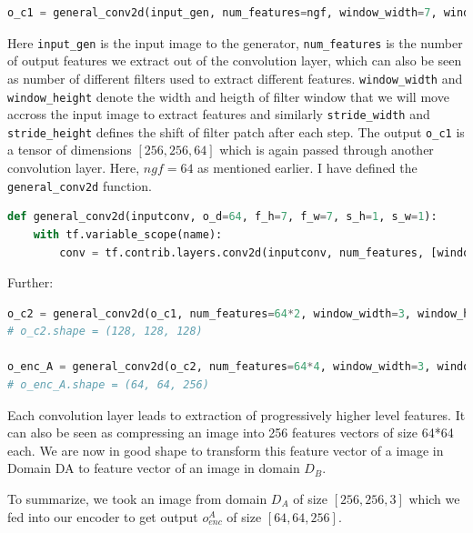 \documentclass[peerreview]{IEEEtran}
\begin{document}
\begin{lstlisting}[language=Python]
o_c1 = general_conv2d(input_gen, num_features=ngf, window_width=7, window_height=7, stride_width=1, stride_height=1)
\end{lstlisting}

Here \verb!input_gen! is the input image to the generator, \verb!num_features! is the number of output features we extract out of the convolution layer, which can also be seen as number of different filters used to extract different features. \verb!window_width! and \verb!window_height! denote the width and heigth of filter window that we will move accross the input image to extract features and similarly \verb!stride_width! and \verb!stride_height! defines the shift of filter patch after each step. The output \verb!o_c1! is a tensor of dimensions $[256,256,64]$ which is again passed through another convolution layer. Here, $ngf = 64$ as mentioned earlier. I have defined the \verb!general_conv2d! function.

\begin{lstlisting}[language=Python]
def general_conv2d(inputconv, o_d=64, f_h=7, f_w=7, s_h=1, s_w=1):
    with tf.variable_scope(name):
        conv = tf.contrib.layers.conv2d(inputconv, num_features, [window_width, window_height], [stride_width, stride_height], padding, activation_fn=None, weights_initializer=tf.truncated_normal_initializer(stddev=stddev), biases_initializer=tf.constant_initializer(0.0))
\end{lstlisting}

Further:

\begin{lstlisting}[language=Python]
o_c2 = general_conv2d(o_c1, num_features=64*2, window_width=3, window_height=3, stride_width=2, stride_height=2)
# o_c2.shape = (128, 128, 128)

o_enc_A = general_conv2d(o_c2, num_features=64*4, window_width=3, window_height=3, stride_width=2, stride_height=2)
# o_enc_A.shape = (64, 64, 256)
\end{lstlisting}

Each convolution layer leads to extraction of progressively higher level features. It can also be seen as compressing an image into 256 features vectors of size 64*64 each. We are now in good shape to transform this feature vector of a image in Domain DA to feature vector of an image in domain $D_B$.

To summarize, we took an image from domain $D_A$ of size $[256,256,3]$ which we fed into our encoder to get output $o_{enc}^A$ of size $[64,64,256]$.
\end{document}
